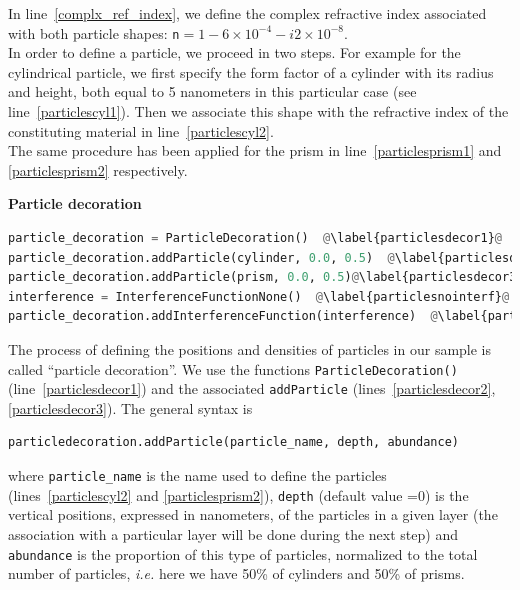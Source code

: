 \noindent In line~\ref{complx_ref_index}, we define the complex refractive index
associated with both particle shapes: \texttt{n}$=1-6\times 10^{-4}-i2\times 10^{-8}$.\\
  
\noindent In order to define a particle, we proceed in two steps. For example for
the cylindrical particle, we first specify the form factor of a cylinder with 
its radius and height, both equal to 5 nanometers in this particular
case (see line~\ref{particlescyl1}). Then we associate this shape with
the refractive index of the constituting material in line~\ref{particlescyl2}.\\

\noindent The same procedure has been applied for the prism in line~\ref{particlesprism1} and \ref{particlesprism2} respectively.

\noindent \textbf{Particle decoration} \\

\begin{lstlisting}[language=python, style=eclipseboxed, name=ex1,nolol]
particle_decoration = ParticleDecoration()  @\label{particlesdecor1}@
particle_decoration.addParticle(cylinder, 0.0, 0.5)  @\label{particlesdecor2}@
particle_decoration.addParticle(prism, 0.0, 0.5)@\label{particlesdecor3}@
interference = InterferenceFunctionNone()  @\label{particlesnointerf}@
particle_decoration.addInterferenceFunction(interference)  @\label{particlesinterf}@
\end{lstlisting}

\noindent The process of defining the positions and densities of particles
in our sample is called ``particle decoration''. We use the functions \texttt{ParticleDecoration()}
(line~\ref{particlesdecor1}) and  the associated \texttt{addParticle}
(lines~\ref{particlesdecor2}, \ref{particlesdecor3}). The general
syntax is 

\begin{lstlisting}[language=python, style=eclipse,numbers=none]
particledecoration.addParticle(particle_name, depth, abundance) 
\end{lstlisting}

\noindent  where \texttt{particle\_name} is the name used to define the particles
(lines~\ref{particlescyl2} and \ref{particlesprism2}), \texttt{depth}
(default value =0)
is the vertical positions, expressed in nanometers, of the particles in a given layer (the
association with a particular layer will be done during the next step) and
\texttt{abundance} is the proportion of this type of particles, 
normalized to the total number of particles, \textit{i.e.} here we have 50\% of cylinders
and 50\% of prisms. \\ 

